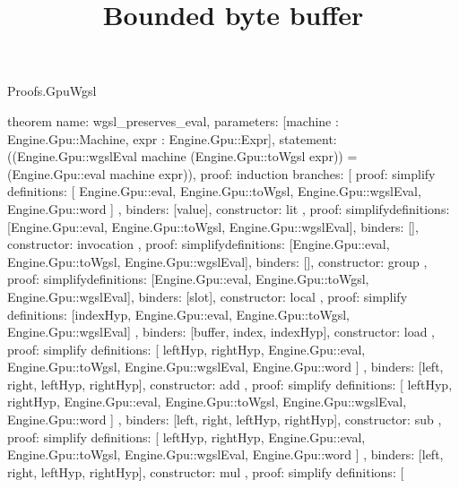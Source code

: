\begin{lexlean}{Proofs.GpuWgsl}
\title{Bounded byte buffer}
\begin{semanticmodule}
theorem{
  name: wgsl_preserves_eval,
  parameters: [machine : Engine.Gpu::Machine, expr : Engine.Gpu::Expr],
  statement: ((Engine.Gpu::wgslEval machine (Engine.Gpu::toWgsl expr)) = (Engine.Gpu::eval machine expr)),
  proof: induction{
    branches: [
      {
        proof: simplify{
          definitions: [
            Engine.Gpu::eval,
            Engine.Gpu::toWgsl,
            Engine.Gpu::wgslEval,
            Engine.Gpu::word
          ]
        },
        binders: [value],
        constructor: lit
      },
      {
        proof: simplify{definitions: [Engine.Gpu::eval, Engine.Gpu::toWgsl, Engine.Gpu::wgslEval]},
        binders: [],
        constructor: invocation
      },
      {
        proof: simplify{definitions: [Engine.Gpu::eval, Engine.Gpu::toWgsl, Engine.Gpu::wgslEval]},
        binders: [],
        constructor: group
      },
      {
        proof: simplify{definitions: [Engine.Gpu::eval, Engine.Gpu::toWgsl, Engine.Gpu::wgslEval]},
        binders: [slot],
        constructor: local
      },
      {
        proof: simplify{
          definitions: [indexHyp, Engine.Gpu::eval, Engine.Gpu::toWgsl, Engine.Gpu::wgslEval]
        },
        binders: [buffer, index, indexHyp],
        constructor: load
      },
      {
        proof: simplify{
          definitions: [
            leftHyp,
            rightHyp,
            Engine.Gpu::eval,
            Engine.Gpu::toWgsl,
            Engine.Gpu::wgslEval,
            Engine.Gpu::word
          ]
        },
        binders: [left, right, leftHyp, rightHyp],
        constructor: add
      },
      {
        proof: simplify{
          definitions: [
            leftHyp,
            rightHyp,
            Engine.Gpu::eval,
            Engine.Gpu::toWgsl,
            Engine.Gpu::wgslEval,
            Engine.Gpu::word
          ]
        },
        binders: [left, right, leftHyp, rightHyp],
        constructor: sub
      },
      {
        proof: simplify{
          definitions: [
            leftHyp,
            rightHyp,
            Engine.Gpu::eval,
            Engine.Gpu::toWgsl,
            Engine.Gpu::wgslEval,
            Engine.Gpu::word
          ]
        },
        binders: [left, right, leftHyp, rightHyp],
        constructor: mul
      },
      {
        proof: simplify{
          definitions: [
}}}}
\end{semanticmodule}
\end{lexlean}

